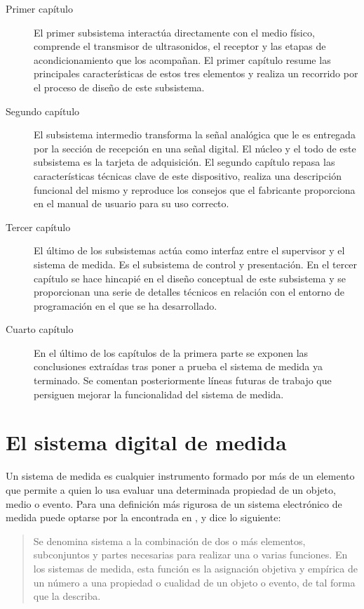\begin{description}
	\item[Primer capítulo] El primer subsistema interactúa directamente
		con el medio físico, comprende el transmisor de
		ultrasonidos, el receptor y las etapas de acondicionamiento
		que los acompañan. El primer capítulo resume las
		principales características de estos tres elementos y
		realiza un recorrido por el proceso de diseño de este
		subsistema.
	\item[Segundo capítulo] El subsistema intermedio transforma la
		señal analógica que le es entregada por la sección de
		recepción en una señal digital.  El núcleo y el todo de
		este subsistema es la tarjeta de adquisición. El segundo
		capítulo repasa las características técnicas clave de este
		dispositivo, realiza una descripción funcional del mismo y
		reproduce los consejos que el fabricante proporciona en el
		manual de usuario para su uso correcto.
	\item[Tercer capítulo] El último de los subsistemas actúa como
		interfaz entre el supervisor y el sistema de medida. Es el
		subsistema de control y presentación. En el tercer capítulo
		se hace hincapié en el diseño conceptual de este subsistema
		y se proporcionan una serie de detalles técnicos en
		relación con el entorno de programación en el que se ha
		desarrollado.
	\item[Cuarto capítulo] En el último de los capítulos de la primera
		parte se exponen las conclusiones extraídas tras poner a
		prueba el sistema de medida ya terminado. Se comentan
		posteriormente líneas futuras de trabajo que persiguen
		mejorar la funcionalidad del sistema de medida.
\end{description}


\section*{El sistema digital de medida}

Un sistema de medida es cualquier instrumento formado por más de un
elemento que permite a quien lo usa evaluar una determinada propiedad de un
objeto, medio o evento. Para una definición más rigurosa de un sistema
electrónico de medida puede optarse por la encontrada en
\cite{pallas2004sas}, y dice lo siguiente:

{\small\begin{quotation}
	Se denomina sistema a la combinación de dos o más elementos,
	subconjuntos y partes necesarias para realizar una o varias
	funciones. En los sistemas de medida, esta función es la asignación
	objetiva y empírica de un número a una propiedad o cualidad de un
	objeto o evento, de tal forma que la describa.
\end{quotation}}

